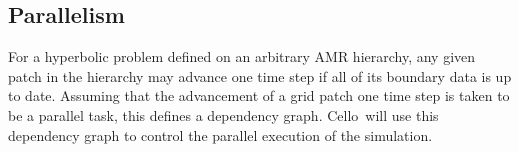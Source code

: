 \documentclass[11pt,letterpaper]{article}
\newcommand{\cello}{\textsf{Cello}}
\newcommand{\code}[1]{\textsf{#1}}
\newcounter{figctr}
\newcommand{\FIGURE}[3]{
\noindent
\parbox{\textwidth}{
\begin{center}
#3
\end{center}%
\ \nolinebreak%
\refstepcounter{figctr}%
\begin{center}%
\begin{minipage}{7.0in}
\textbf{Figure \thefigctr}. #1
\end{minipage}
\end{center}
\label{#2}
}}
\begin{document}



\subsection{Parallelism} \label{ss:design-parallel}

For a hyperbolic problem defined on an arbitrary AMR hierarchy, any
given patch in the hierarchy may advance one time step if all of its
boundary data is up to date.  Assuming that the advancement of a grid
patch one time step is taken to be a parallel task, this defines a
dependency graph.  \cello\ will use this dependency graph to control
the parallel execution of the simulation.
\end{document}
